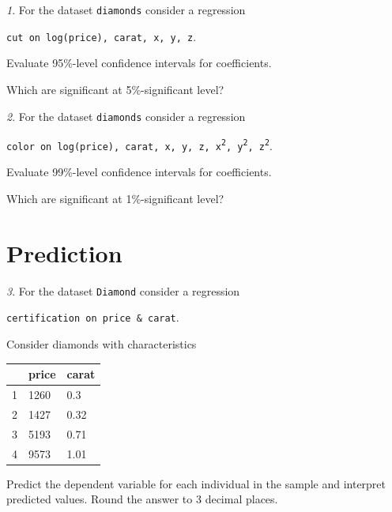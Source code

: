 \documentclass[12pt]{article}
\theoremstyle{remark}
\newtheorem{problem}{}[section]
\begin{document}
\begin{problem}
For the dataset \texttt{diamonds} consider a regression
\begin{center}
	\texttt{cut on log(price), carat, x, y, z}.
\end{center}
Evaluate 95\%-level confidence intervals for coefficients.

Which are significant at 5\%-significant level?
\end{problem}

\begin{problem}
For the dataset \texttt{diamonds} consider a regression
\begin{center}
	\texttt{color on log(price), carat, x, y, z, x\textsuperscript{2}, y\textsuperscript{2}, z\textsuperscript{2}}.
\end{center}
Evaluate 99\%-level confidence intervals for coefficients.

Which are significant at 1\%-significant level?
\end{problem}

\section{Prediction}

\begin{problem}
For the dataset \texttt{Diamond} consider a regression
\begin{center}
	\texttt{certification on price \& carat}.
\end{center}
Consider diamonds with characteristics
\begin{center}
	\begin{tabular}{c|l|l}
		& price & carat \\ \hline
	1 & 1260 & 0.3 \\
	2 & 1427 & 0.32 \\
	3 & 5193 & 0.71 \\
	4 & 9573 & 1.01 \\ \hline
	\end{tabular}
\end{center}
Predict the dependent variable for each individual in the sample and interpret predicted values. 
Round the answer to 3 decimal places.
\end{problem}
\end{document}
